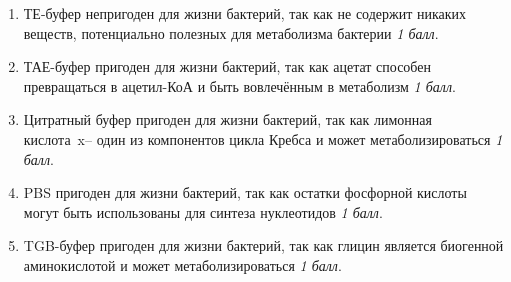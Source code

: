 \solutionSection

\begin{enumerate}
    \item ТЕ-буфер непригоден для жизни бактерий, так как не содержит никаких веществ, потенциально полезных для метаболизма бактерии \textit{1 балл}.
    \item ТАЕ-буфер пригоден для жизни бактерий, так как ацетат способен превращаться в ацетил-КоА и быть вовлечённым в метаболизм \textit{1 балл}.
    \item Цитратный буфер пригоден для жизни бактерий, так как лимонная кислота~x– один из компонентов цикла Кребса и может метаболизироваться \textit{1 балл}.
    \item PBS пригоден для жизни бактерий, так как остатки фосфорной кислоты могут быть использованы для синтеза нуклеотидов \textit{1 балл}.
    \item TGB-буфер пригоден для жизни бактерий, так как глицин является биогенной аминокислотой и может метаболизироваться \textit{1 балл}.
\end{enumerate}
